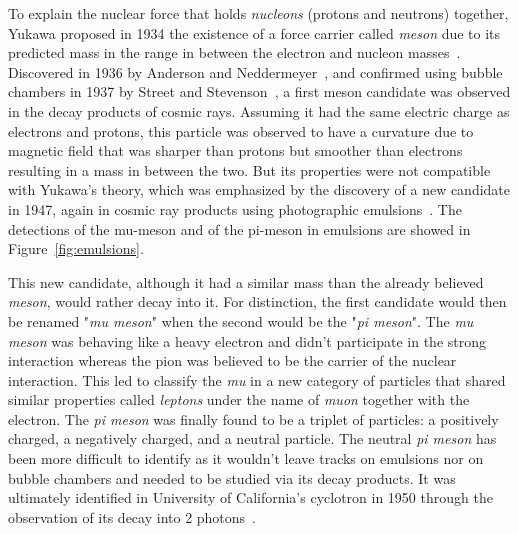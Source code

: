 	To explain the nuclear force that holds \textit{nucleons} (protons and neutrons) together, Yukawa proposed in 1934 the existence of a force carrier called \textit{meson} due to its predicted mass in the range in between the electron and nucleon masses~\cite{YUKAWA1935}. Discovered in 1936 by Anderson and Neddermeyer~\cite{ANDERSON1936,NEDDERMEYER1937}, and confirmed using bubble chambers in 1937 by Street and Stevenson~\cite{STREET1937}, a first meson candidate was observed in the decay products of cosmic rays. Assuming it had the same electric charge as electrons and protons, this particle was observed to have a curvature due to magnetic field that was sharper than protons but smoother than electrons resulting in a mass in between the two. But its properties were not compatible with Yukawa's theory, which was emphasized by the discovery of a new candidate in 1947, again in cosmic ray products using photographic emulsions~\cite{LATTES1947I,LATTES1947II,LATTES1947III}. The detections of the mu-meson and of the pi-meson in emulsions are showed in Figure~\ref{fig:emulsions}.
	
	This new candidate, although it had a similar mass than the already believed \textit{meson}, would rather decay into it. For distinction, the first candidate would then be renamed "\textit{mu meson}" when the second would be the "\textit{pi meson}". The \textit{mu meson} was behaving like a heavy electron and didn't participate in the strong interaction whereas the pion was believed to be the carrier of the nuclear interaction. This led to classify the \textit{mu} in a new category of particles  that shared similar properties called \textit{leptons} under the name of \textit{muon} together with the electron. The \textit{pi meson} was finally found to be a triplet of particles: a positively charged, a negatively charged, and a neutral particle. The neutral \textit{pi meson} has been more difficult to identify as it wouldn't leave tracks on emulsions nor on bubble chambers and needed to be studied via its decay products. It was ultimately identified in University of California's cyclotron in 1950 through the observation of its decay into 2 photons~\cite{BJORKLUND1950}.
	
